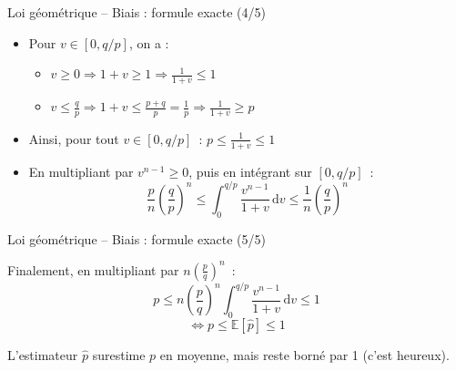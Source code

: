 \documentclass[11pt,aspectratio=169]{beamer}
\newcommand{\dd}{\mathrm{d}}
\begin{document}
\begin{frame}{Loi géométrique -- Biais : formule exacte (4/5)}

  \begin{itemize}

  \item Pour $v \in [0, q/p]$, on a :\newline

    \begin{itemize}

    \item $v \geq 0 \Rightarrow 1+v \geq 1 \Rightarrow \frac{1}{1+v} \leq 1$\newline

    \item $v \leq \frac{q}{p} \Rightarrow 1+v \leq \frac{p+q}{p} = \frac{1}{p} \Rightarrow \frac{1}{1+v} \geq p$\newline

    \end{itemize}

    \medskip
    
  \item Ainsi, pour tout $v \in [0, q/p]$~: $p \leq \frac{1}{1+v} \leq 1$\newline

  \item En multipliant par $v^{n-1} \geq 0$, puis en intégrant sur $[0,q/p]$~:
  \[
      \frac{p}{n}\left(\frac{q}{p}\right)^n \leq \int_0^{q/p} \frac{v^{n-1}}{1+v} \, \dd v \leq \frac{1}{n}\left(\frac{q}{p}\right)^n
    \]

  \end{itemize}

\end{frame}

\begin{frame}{Loi géométrique -- Biais : formule exacte (5/5)}


  Finalement, en multipliant par $n\left(\frac{p}{q}\right)^n$~:
    \[
      p \leq n\left(\frac{p}{q}\right)^n \int_0^{q/p} \frac{v^{n-1}}{1+v} \, \dd v \leq 1
    \]
    \[
      \Leftrightarrow p \leq \mathbb{E}[\hat{p}] \leq 1
    \]

    \bigskip
    
  L'estimateur $\hat{p}$ surestime $p$ en moyenne, mais reste borné par 1 (c'est heureux).

\end{frame}
\end{document}
